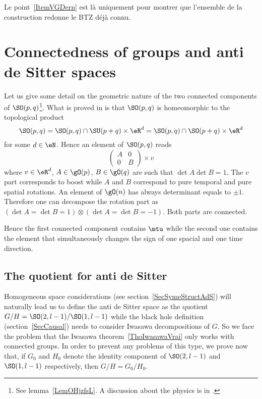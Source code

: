 Le point~\ref{ItemVGDern} est là uniquement pour montrer que l'ensemble de la construction redonne le BTZ déjà connu.

\section{Connectedness of groups and anti de Sitter spaces}

\label{PgDisGeoConnSO}Let us give some detail on the geometric nature of the two connected components of $\SO(p,q)$\footnote{See lemma~\ref{LemOHjzfsL}. A discussion about the physics is in \cite{Schomblond_em}.}. What is proved in \cite{HelgasonSym} is that $\SO(p,q)$ is homeomorphic to the topological product
\[
	\SO(p,q)=\SO(p,q)\cap\SU(p+q)\times \eR^{d}=\SO(p,q)\cap\SO(p+q)\times \eR^{d}
\]
for some $d\in\eN$. Hence an element of $\SO(p,q)$ reads
\[
	\begin{pmatrix}
		A & 0 \\
		0 & B
	\end{pmatrix}\times v
\]
where $v\in\eR^{d}$, $A\in \gO(p)$, $B\in\gO(q)$ are such that $\det A\det B=1$. The $v$ part corresponds to boost while $A$ and $B$ correspond to pure temporal and pure spatial rotations. An element of $\gO(n)$ has always determinant equals to $\pm 1$. Therefore one can decompose the rotation part as $(\det A=\det B=1)\otimes (\det A=\det B=-1)$. Both parts are connected.

Hence the first connected component contains $\mtu$ while the second one contains the element that simultaneously changes the sign of one spacial and one time direction.

\subsection{The quotient for anti de Sitter}

Homogeneous space considerations (see section~\ref{SecSymeStructAdS}) will naturally lead us to define the anti de Sitter space as the quotient $G/H=\SO(2,l-1)/\SO(1,l-1)$ while the black hole definition (section~\ref{SecCausal}) needs to consider Iwasawa decompositions of $G$. So we face the problem that the Iwasawa theorem~\ref{ThoIwasawaVrai} only works with connected groups. In order to prevent any problems of this type, we prove now that, if $G_0$ and $H_0$ denote the identity component of $\SO(2,l-1)$ and $\SO(1,l-1)$ respectively, then $G/H=G_0/H_0$.


